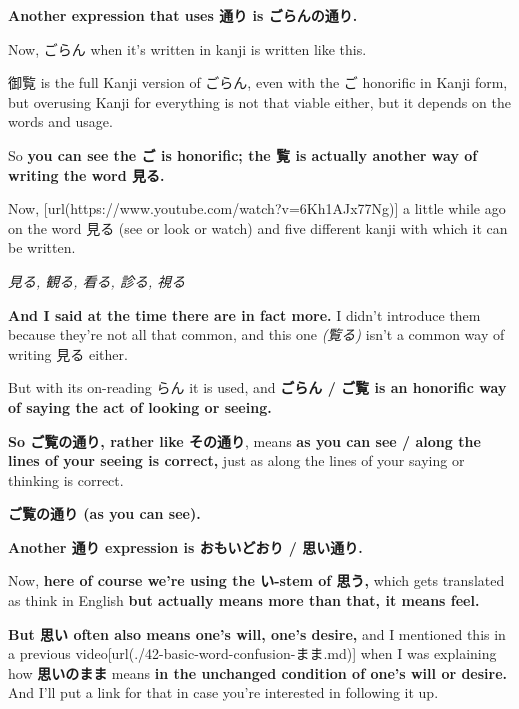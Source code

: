 \stopsectionlevel

\startsectionlevel[title={ごらんの通り / ご覧の通り},reference={ごらんの通り-ご覧の通り}]

{\bf Another expression that uses 通り is ごらんの通り.}

{}

Now, ごらん when it's written in kanji is written like this.

{}

御覧 is the full Kanji version of ごらん, even with the ご honorific in Kanji form, but overusing Kanji for everything is not that viable either, but it depends on the words and usage.

So {\bf you can see the ご is honorific; the 覧 is actually another way of writing the word 見る.}

Now, [url(https://www.youtube.com/watch?v=6Kh1AJx77Ng)] a little while ago on the word 見る (see or look or watch) and five different kanji with which it can be written.

{\em 見る, 観る, 看る, 診る, 視る}

{\bf And I said at the time there are in fact more.} I didn't introduce them because they're not all that common, and this one {\em (覧る)} isn't a common way of writing 見る either.

But with its on-reading らん it is used, and {\bf ごらん / ご覧 is an honorific way of saying the act of looking or seeing.}

{\bf So ご覧の通り, rather like その通り}, means {\bf as you can see / along the lines of your seeing is correct,} just as along the lines of your saying or thinking is correct.

{\bf ご覧の通り (as you can see).}

\stopsectionlevel

\startsectionlevel[title={思い通り},reference={思い通り}]

{\bf Another 通り expression is おもいどおり / 思い通り.}

{}

Now, {\bf here of course we're using the い-stem of 思う,} which gets translated as think in English {\bf but actually means more than that, it means feel.}

{\bf But 思い often also means one's will, one's desire,} and I mentioned this in a previous video\goto{{[}42{]}}[url(./42-basic-word-confusion-まま.md)] when I was explaining how {\bf 思いのまま} means {\bf in the unchanged condition of one's will or desire.} And I'll put a link for that in case you're interested in following it up.

